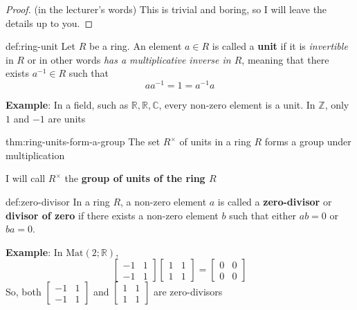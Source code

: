 \documentclass{article}
\begin{document}
\begin{proof}
    (in the lecturer's words) This is trivial and boring, so I will leave the details up to you.
\end{proof}

\begin{dfn}{def:ring-unit}{}
    Let $R$ be a ring. An element $a\in R$ is called a \textbf{unit} if it is \textit{invertible} in $R$ or in other words \textit{has a multiplicative inverse in $R$}, meaning that there exists $a^{-1}\in R$ such that
    \[aa^{-1} = 1 = a^{-1} a\]
\end{dfn}

\textbf{Example}: In a field, such as $\mathbb{R}, \mathbb{R}, \mathbb{C}$, every non-zero element is a unit. In $\mathbb{Z}$, only $1$ and $-1$ are units

\begin{thm}{thm:ring-units-form-a-group}{}
    The set $R^{\times}$ of units in a ring $R$ forms a group under multiplication
\end{thm}

I will call $R^{\times}$ the \textbf{group of units of the ring $R$}

\begin{dfn}{def:zero-divisor}{}
    In a ring $R$, a non-zero element $a$ is called a \textbf{zero-divisor} or \textbf{divisor of zero} if there exists a non-zero element $b$ such that either $ab = 0$ or $ba = 0$.
\end{dfn}

\textbf{Example}: In $\text{Mat}(2; \mathbb{R})$,
\[\begin{bmatrix}
    -1& 1\\
    -1& 1
\end{bmatrix} \begin{bmatrix}
    1& 1\\
    1& 1
\end{bmatrix} = \begin{bmatrix}
    0& 0\\
    0& 0
\end{bmatrix}\]
So, both $\begin{bmatrix}
    -1& 1\\
    -1& 1
\end{bmatrix}$ and $\begin{bmatrix}
    1& 1\\
    1& 1
\end{bmatrix}$ are zero-divisors
\end{document}
